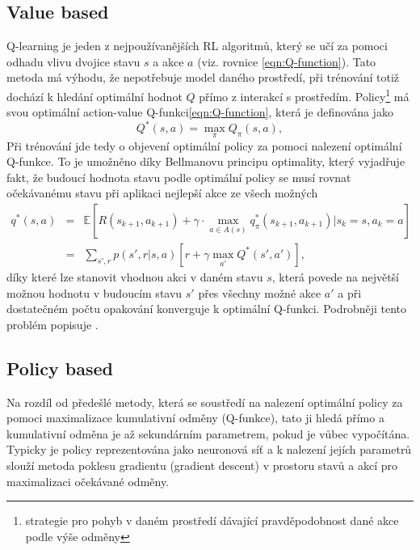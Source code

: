 \documentclass[czech, bc, kky, he, iso690alph]{fasthesis}
\begin{document}
            \subsection{Value based}
	            Q-learning je jeden z nejpoužívanějších RL algoritmů, který se učí za pomoci odhadu vlivu dvojice stavu \(s\) a akce \(a\) (viz. rovnice \ref{eqn:Q-function}). Tato metoda má výhodu, že nepotřebuje model daného prostředí, při trénování totiž dochází k hledání optimální hodnot \(Q\) přímo z interakcí s prostředím. Policy\footnote{strategie pro pohyb v daném prostředí dávající pravděpodobnost dané akce podle výše odměny} má svou optimální action-value Q-funkci\ref{eqn:Q-function}, která je definována jako
	                \begin{equation}
	                    Q^{*}(s,a)= \max_{\pi}Q_{\pi}(s,a),
	                \end{equation}
	            Při trénování jde tedy o objevení optimální policy za pomoci nalezení optimální Q-funkce. To je umožněno díky Bellmanovu principu optimality, který vyjadřuje fakt, že budoucí hodnota stavu podle optimální policy se musí rovnat očekávanému stavu při aplikaci nejlepší akce ze všech možných
	                \begin{eqnarray}
	                	q^{*}(s,a)&=&\mathbb{E}[R(s_{k+1},a_{k+1}) + \gamma\cdot\max_{a \in A(s)}q_{\pi}^{*}(s_{k+1},a_{k+1}) | s_{k} = s, a_{k} = a]\\
	                	&=& \sum_{s', r}p(s', r|s, a)\left[r+\gamma\max_{a'}Q^{*}(s',a')\right],
	                \end{eqnarray}      
	            díky které lze stanovit vhodnou akci v daném stavu \(s\), která povede na největší možnou hodnotu v budoucím stavu \(s'\) přes všechny možné akce \(a'\) a při dostatečném počtu opakování konverguje k optimální Q-funkci. Podrobněji tento problém popisuje \cite[p.~63]{RLbook}.  
            \subsection{Policy based}
	            Na rozdíl od předešlé metody, která se soustředí na nalezení optimální policy za pomoci maximalizace kumulativní odměny (Q-funkce), tato ji hledá přímo a kumulativní odměna je až sekundárním parametrem, pokud je vůbec vypočítána. Typicky je policy reprezentována jako neuronová síť a k nalezení jejích parametrů slouží metoda poklesu gradientu (gradient descent) v prostoru stavů a akcí pro maximalizaci očekávané odměny.
	            
\end{document}
